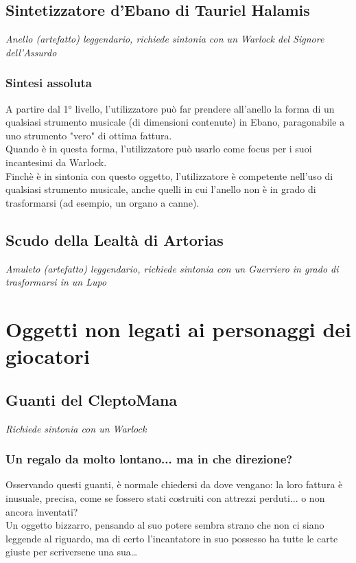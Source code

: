 \subsection{Sintetizzatore d'Ebano di Tauriel Halamis}
\textit{Anello (artefatto) leggendario, richiede sintonia con un Warlock del Signore dell'Assurdo}

\subsubsection{Sintesi assoluta}
A partire dal 1° livello, l'utilizzatore può far prendere all'anello la forma di un qualsiasi strumento musicale (di dimensioni contenute) in Ebano, paragonabile a uno strumento "vero" di ottima fattura.\\ Quando è in questa forma, l'utilizzatore può usarlo come focus per i suoi incantesimi da Warlock.\\ Finchè è in sintonia con questo oggetto, l'utilizzatore è competente nell'uso di qualsiasi strumento musicale, anche quelli in cui l'anello non è in grado di trasformarsi (ad esempio, un organo a canne).

\subsection{Scudo della Lealtà di Artorias}
\textit{Amuleto (artefatto) leggendario, richiede sintonia con un Guerriero in grado di trasformarsi in un Lupo}

\section{Oggetti non legati ai personaggi dei giocatori}

\subsection{Guanti del CleptoMana}
\textit{Richiede sintonia con un Warlock} 

\subsubsection{Un regalo da molto lontano... ma in che direzione?}
Osservando questi guanti, è normale chiedersi da dove vengano: la loro fattura è inusuale, precisa, come se fossero stati costruiti con attrezzi perduti... o non ancora inventati? \\
Un oggetto bizzarro, pensando al suo potere sembra strano che non ci siano leggende al riguardo, ma di certo l'incantatore in suo possesso ha tutte le carte giuste per scriversene una sua…

